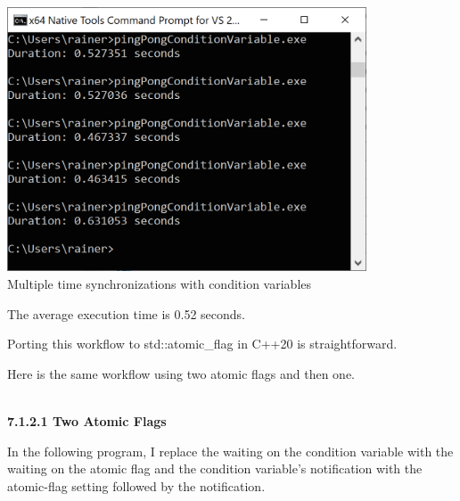 \begin{center}
\includegraphics[width=0.8\textwidth]{content/3/chapter7/images/2.png}\\
Multiple time synchronizations with condition variables
\end{center}

The average execution time is 0.52 seconds.

Porting this workflow to std::atomic\_flag in C++20 is straightforward.


Here is the same workflow using two atomic flags and then one.

\hspace*{\fill} \\ %
\noindent
\textbf{7.1.2.1\hspace{0.2cm} Two Atomic Flags}

In the following program, I replace the waiting on the condition variable with the waiting on the atomic flag and the condition variable’s notification with the atomic-flag setting followed by the notification.

